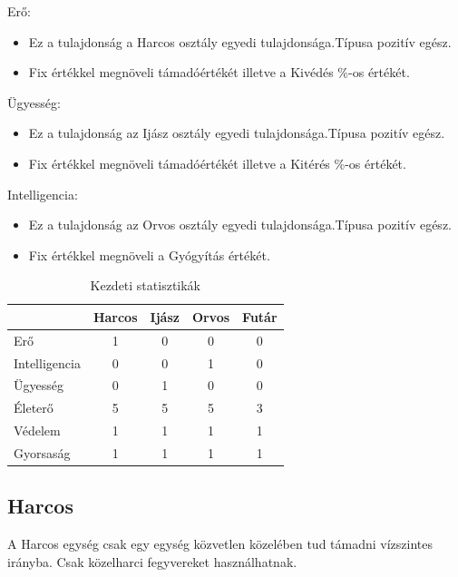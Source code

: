 Erő:

\begin{itemize}
  \item Ez a tulajdonság a Harcos osztály egyedi tulajdonsága.Típusa pozitív egész.
  \item Fix értékkel megnöveli támadóértékét illetve a Kivédés \%-os értékét.
\end{itemize}

Ügyesség:

\begin{itemize}
  \item Ez a tulajdonság az Ijász osztály egyedi tulajdonsága.Típusa pozitív egész.
  \item Fix értékkel megnöveli támadóértékét illetve a Kitérés \%-os értékét.
\end{itemize}

Intelligencia:

\begin{itemize}
  \item Ez a tulajdonság az Orvos osztály egyedi tulajdonsága.Típusa pozitív egész.
  \item Fix értékkel megnöveli a Gyógyítás értékét.
\end{itemize}

\begin{table}[!ht]
\centering
\caption{Kezdeti statisztikák}
\label{tab:table1}
\begin{tabular}{|l|c|c|c|c|}
\hline
 & Harcos & Ijász & Orvos & Futár \\
\hline
Erő & 1 & 0 & 0 & 0  \\
\hline
Intelligencia & 0 & 0 & 1 & 0  \\
\hline
Ügyesség & 0 & 1 & 0 & 0 \\
\hline
Életerő & 5 & 5 & 5 & 3 \\
\hline
Védelem & 1 & 1 & 1 & 1  \\
\hline
Gyorsaság & 1 & 1 & 1 &1 \\
\hline
\end{tabular}
\end{table}

\newpage

\subsection{Harcos}

A Harcos egység csak egy egység közvetlen közelében tud támadni vízszintes irányba.
\newline
Csak közelharci fegyvereket használhatnak.

